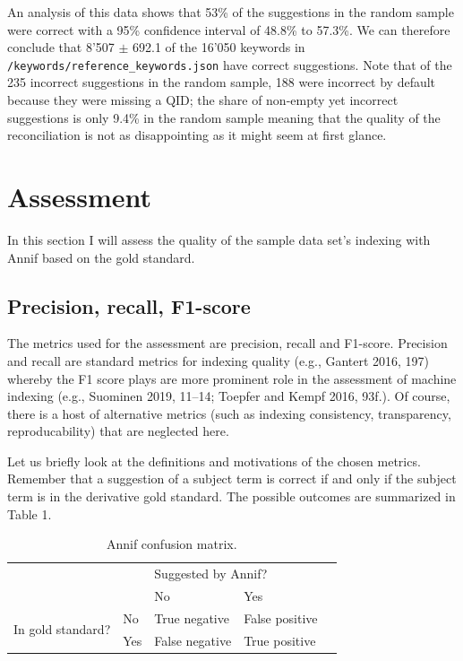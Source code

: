 An analysis of this data shows that 53\% of the suggestions in the
random sample were correct with a 95\% confidence interval of 48.8\% to
57.3\%. We can therefore conclude that 8'507 \(\pm\) 692.1 of the 16'050
keywords in \texttt{/keywords/reference\_keywords.json} have correct
suggestions. Note that of the 235 incorrect suggestions in the random
sample, 188 were incorrect by default because they were missing a QID;
the share of non-empty yet incorrect suggestions is only 9.4\% in the
random sample meaning that the quality of the reconciliation is not as
disappointing as it might seem at first glance.

\hypertarget{assessment}{%
\section{Assessment}\label{assessment}}

In this section I will assess the quality of the sample data set's
indexing with Annif based on the gold standard.

\hypertarget{precision-recall-f1-score}{%
\subsection{Precision, recall,
F1-score}\label{precision-recall-f1-score}}

The metrics used for the assessment are precision, recall and F1-score.
Precision and recall are standard metrics for indexing quality (e.g.,
Gantert 2016, 197) whereby the F1 score plays are more prominent role in
the assessment of machine indexing (e.g., Suominen 2019, 11--14; Toepfer
and Kempf 2016, 93f.). Of course, there is a host of alternative metrics
(such as indexing consistency, transparency, reproducability) that are
neglected here.

Let us briefly look at the definitions and motivations of the chosen
metrics. Remember that a suggestion of a subject term is correct if and
only if the subject term is in the derivative gold standard. The
possible outcomes are summarized in Table 1.

\begin{table}[h]
\centering
\begin{tabular}{lllll}
 &                       & \multicolumn{2}{l}{Suggested by Annif?}            &  \\ \cline{3-4}
 & \multicolumn{1}{l|}{} & \multicolumn{1}{l|}{No} & \multicolumn{1}{l|}{Yes} &  \\ \cline{2-4}
\multicolumn{1}{l|}{\multirow{2}{*}{In gold standard?}} & \multicolumn{1}{l|}{No}  & \multicolumn{1}{l|}{True negative}  & \multicolumn{1}{l|}{False positive} &  \\ \cline{2-4}
\multicolumn{1}{l|}{}                                   & \multicolumn{1}{l|}{Yes} & \multicolumn{1}{l|}{False negative} & \multicolumn{1}{l|}{True positive}  &  \\ \cline{2-4}
\end{tabular}
\caption{Annif confusion matrix.}
\label{tab:confusion-matrix}
\end{table}


